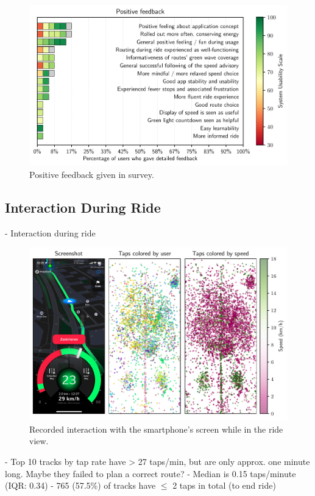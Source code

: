 \begin{figure}[t]
\caption{Positive feedback given in survey.}\label{fig:app-positive-feedback}
\includegraphics[width=\linewidth]{images/app-feedback-positive.pdf}
\end{figure}


\subsection{Interaction During Ride}

- Interaction during ride

\begin{figure}[t]
\caption{Recorded interaction with the smartphone's screen while in the ride view.}\label{fig:app-user-interaction}
\includegraphics[width=\linewidth]{images/app-user-interaction.pdf}
\end{figure}

- Top 10 tracks by tap rate have > 27 taps/min, but are only approx. one minute long. Maybe they failed to plan a correct route?
- Median is 0.15 taps/minute (IQR: 0.34)
- 765 (57.5\%) of tracks have $\leq$ 2 taps in total (to end ride)

